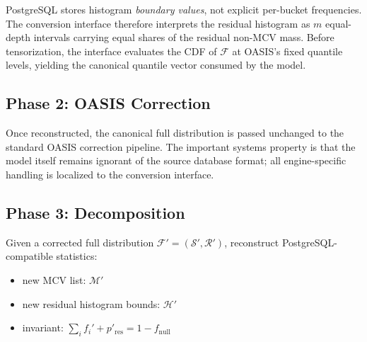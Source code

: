 PostgreSQL stores histogram \emph{boundary values}, not explicit per-bucket
frequencies. The conversion interface therefore interprets the residual
histogram as $m$ equal-depth intervals carrying equal shares of the residual
non-MCV mass. Before tensorization, the interface evaluates the CDF of
$\mathcal{F}$ at OASIS's fixed quantile levels, yielding the canonical quantile
vector consumed by the model.

\subsection{Phase 2: OASIS Correction}

Once reconstructed, the canonical full distribution is passed unchanged to the
standard OASIS correction pipeline. The important systems property is that the
model itself remains ignorant of the source database format; all engine-specific
handling is localized to the conversion interface.

\subsection{Phase 3: Decomposition}

Given a corrected full distribution $\mathcal{F}' = (\mathcal{S}', \mathcal{R}')$,
reconstruct PostgreSQL-compatible statistics:
\begin{itemize}
    \item new MCV list: $\mathcal{M}'$
    \item new residual histogram bounds: $\mathcal{H}'$
    \item invariant: $\sum_i f_i' + p'_{\mathrm{res}} = 1 - f_{\mathrm{null}}$
\end{itemize}

